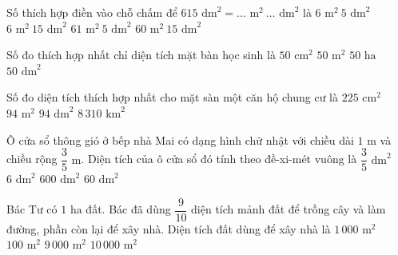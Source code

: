 \begin{ex} %
Số thích hợp điền vào chỗ chấm để $615\text{ dm}^2 = \dots\text{ m}^2\ \dots\text{ dm}^2$ là
\choice
{$6\text{ m}^2\ 5\text{ dm}^2$}
{\True $6\text{ m}^2\ 15\text{ dm}^2$}
{$61\text{ m}^2\ 5\text{ dm}^2$}
{$60\text{ m}^2\ 15\text{ dm}^2$}
\end{ex}

\begin{ex} %
Số đo thích hợp nhất chỉ diện tích mặt bàn học sinh là
\choice
{$50\text{ cm}^2$}
{$50\text{ m}^2$}
{$50\text{ ha}$}
{\True $50\text{ dm}^2$}
\end{ex}

\begin{ex} %
Số đo diện tích thích hợp nhất cho mặt sàn một căn hộ chung cư là
\choice
{$225\text{ cm}^2$}
{\True $94\text{ m}^2$}
{$94\text{ dm}^2$}
{$8\,310\text{ km}^2$}
\end{ex}

\begin{ex} %
Ô cửa sổ thông gió ở bếp nhà Mai có dạng hình chữ nhật với chiều dài $1\text{ m}$ và chiều rộng $\dfrac{3}{5}\text{ m}$. Diện tích của ô cửa sổ đó tính theo đề-xi-mét vuông là
\choice
{$\dfrac{3}{5}\text{ dm}^2$}
{$6\text{ dm}^2$}
{$600\text{ dm}^2$}
{\True $60\text{ dm}^2$}
\end{ex}

\begin{ex} %
Bác Tư có $1\text{ ha}$ đất. Bác đã dùng $\dfrac{9}{10}$ diện tích mảnh đất để trồng cây và làm đường, phần còn lại để xây nhà. Diện tích đất dùng để xây nhà là
\choice
{\True $1\,000\text{ m}^2$}
{$100\text{ m}^2$}
{$9\,000\text{ m}^2$}
{$10\,000\text{ m}^2$}
\end{ex}

